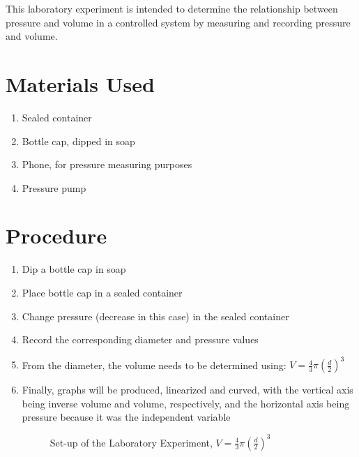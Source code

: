 \documentclass{article}
\begin{document}
This laboratory experiment is intended to determine the relationship between pressure and volume in a controlled system by measuring and recording pressure and volume.

\section{Materials Used}

\begin{enumerate}

  \item Sealed container

  \item Bottle cap, dipped in soap

  \item Phone, for pressure measuring purposes

  \item Pressure pump

\end{enumerate}

\section{Procedure}

\begin{enumerate}

  \item Dip a bottle cap in soap

  \item Place bottle cap in a sealed container

  \item Change pressure (decrease in this case) in the sealed container

  \item Record the corresponding diameter and pressure values

  \item From the diameter, the volume needs to be determined using: $V=\frac{4}{3}\pi\left( \frac{d}{2} \right)^3$

  \item Finally, graphs will be produced, linearized and curved, with the vertical axis being inverse volume and volume, respectively, and the horizontal axis being pressure because it was the independent variable

    \begin{figure}[H]
      \centering
      
      \caption{Set-up of the Laboratory Experiment, $V=\frac{4}{3}\pi\left( \frac{d}{2} \right)^3$}
      \label{fig:1}
    \end{figure}

\end{enumerate}
\end{document}
